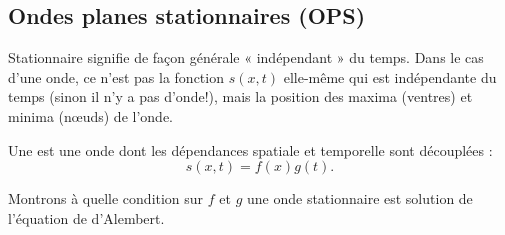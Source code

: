 \documentclass[12pt,fancy]{cours}
\begin{document}
\subsection{Ondes planes stationnaires (OPS)}

 Stationnaire signifie de façon générale « indépendant » du temps. Dans le cas d'une onde, ce n'est pas la fonction $s(x,t)$ elle-même qui est indépendante du temps (sinon il n'y a pas d'onde!), mais la position des maxima (ventres) et minima (nœuds) de l'onde.

\begin{definition}[OPS]\label{def:}
  Une  est une onde dont les dépendances spatiale et temporelle sont découplées :
  \begin{equation*}
  \label{eq:OS}
  s(x,t)=f(x)g(t).
  \end{equation*}
\end{definition}



\noindent
Montrons à quelle condition sur $f$ et $g$ une onde stationnaire est solution de l'équation de d'Alembert. 
\end{document}

